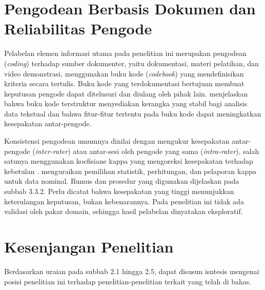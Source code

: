 \section{Pengodean Berbasis Dokumen dan Reliabilitas Pengode}

Pelabelan elemen informasi utama pada penelitian ini merupakan pengodean (\textit{coding}) terhadap sumber dokumenter, yaitu dokumentasi, materi pelatihan, dan video demonstrasi, menggunakan buku kode (\textit{codebook}) yang mendefinisikan kriteria secara tertulis. Buku kode yang terdokumentasi bertujuan membuat keputusan pengode dapat ditelusuri dan diulang oleh pihak lain. \citet{macqueen1998codebook} menjelaskan bahwa buku kode terstruktur menyediakan kerangka yang stabil bagi analisis data tekstual dan bahwa fitur-fitur tertentu pada buku kode dapat meningkatkan kesepakatan antar-pengode.

Konsistensi pengodean umumnya dinilai dengan mengukur kesepakatan antar-pengode (\textit{inter-rater}) atau antar-sesi oleh pengode yang sama (\textit{intra-rater}), salah satunya menggunakan koefisiane kappa yang mengoreksi kesepakatan terhadap kebetulan \citep{cohen1960coefficient}. \citet{hallgren2012computing} menguraikan pemilihan statistik, perhitungan, dan pelaporan kappa untuk data nominal. Rumus dan prosedur yang digunakan dijelaskan pada subbab 3.3.2. Perlu dicatat bahwa kesepakatan yang tinggi menunjukkan keterulangan keputusan, bukan kebenarannya. Pada penelitian ini tidak ada validasi oleh pakar domain, sehingga hasil pelabelan dinyatakan eksploratif.



\section{Kesenjangan Penelitian}

Berdasarkan uraian pada subbab 2.1 hingga 2.5, dapat disusun isntesis mengenai posisi penelitian ini terhadap penelitian-penelitian terkait yang telah di bahas.

